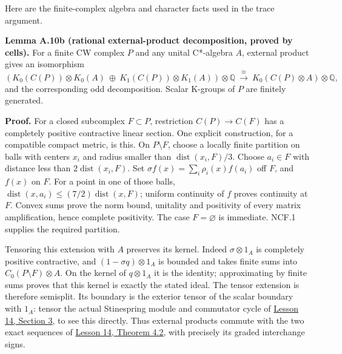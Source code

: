 \documentclass[
  11pt,
]{article}
\begin{document}
Here are the finite-complex algebra and character facts used in the
trace argument.

\textbf{Lemma A.10b (rational external-product decomposition, proved by
cells).} For a finite CW complex \(P\) and any unital C*-algebra \(A\),
external product gives an isomorphism \[
 \left(K_0(C(P))\otimes K_0(A)\ \oplus\
       K_1(C(P))\otimes K_1(A)\right)\otimes\mathbb Q
          \ \xrightarrow{\ \cong\ }\
                    K_0(C(P)\otimes A)\otimes\mathbb Q ,
 \tag{R2}
\] and the corresponding odd decomposition. Scalar K-groups of \(P\) are
finitely generated.

\textbf{Proof.} For a closed subcomplex \(F\subset P\), restriction
\(C(P)\to C(F)\) has a completely positive contractive linear section.
One explicit construction, for a compatible compact metric, is this. On
\(P\setminus F\), choose a locally finite partition on balls with
centers \(x_i\) and radius smaller than
\(\operatorname{dist}(x_i,F)/3\). Choose \(a_i\in F\) with distance less
than \(2\operatorname{dist}(x_i,F)\). Set
\(\sigma f(x)=\sum_i\rho_i(x)f(a_i)\) off \(F\), and \(f(x)\) on \(F\).
For a point in one of those balls,
\(\operatorname{dist}(x,a_i)\leq(7/2)\operatorname{dist}(x,F)\); uniform
continuity of \(f\) proves continuity at \(F\). Convex sums prove the
norm bound, unitality and positivity of every matrix amplification,
hence complete positivity. The case \(F=\varnothing\) is immediate.
NCF.1 supplies the required partition.

Tensoring this extension with \(A\) preserves its kernel. Indeed
\(\sigma\otimes1_A\) is completely positive contractive, and
\((1-\sigma q)\otimes1_A\) is bounded and takes finite sums into
\(C_0(P\setminus F)\otimes A\). On the kernel of \(q\otimes1_A\) it is
the identity; approximating by finite sums proves that this kernel is
exactly the stated ideal. The tensor extension is therefore semisplit.
Its boundary is the exterior tensor of the scalar boundary with \(1_A\):
tensor the actual Stinespring module and commutator cycle of
\href{KT-KK-14.html\#3-semisplit-extensions-and-their-classes}{Lesson
14, Section 3}, to see this directly. Thus external products commute
with the two exact sequences of
\href{KT-KK-14.html\#4-excision-and-the-six-term-sequences}{Lesson 14,
Theorem 4.2}, with precisely its graded interchange signs.
\end{document}
